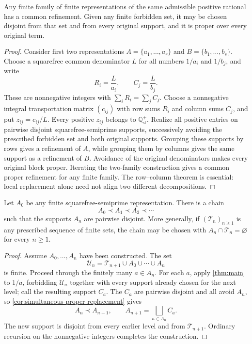 \begin{theorem}
\label{thm:common-refinement}
Any finite family of finite representations of the same admissible positive rational has a common refinement.  Given any finite forbidden set, it may be chosen disjoint from that set and from every original support, and it is proper over every original term.
\end{theorem}

\begin{proof}
Consider first two representations $A=\{a_1,\ldots,a_r\}$ and $B=\{b_1,\ldots,b_s\}$.  Choose a squarefree common denominator $L$ for all numbers $1/a_i$ and $1/b_j$, and write
\[
 R_i=\frac{L}{a_i},
 \qquad
 C_j=\frac{L}{b_j}.
\]
These are nonnegative integers with $\sum_iR_i=\sum_jC_j$.  Choose a nonnegative integral transportation matrix $(c_{ij})$ with row sums $R_i$ and column sums $C_j$, and put $z_{ij}=c_{ij}/L$.  Every positive $z_{ij}$ belongs to $\mathbb Q_{\mathrm{sf}}^+$.  Realize all positive entries on pairwise disjoint squarefree-semiprime supports, successively avoiding the prescribed forbidden set and both original supports.  Grouping these supports by rows gives a refinement of $A$, while grouping them by columns gives the same support as a refinement of $B$.  Avoidance of the original denominators makes every original block proper.  Iterating the two-family construction gives a common proper refinement for any finite family.  The row--column theorem is essential: local replacement alone need not align two different decompositions.
\end{proof}

\begin{theorem}
\label{thm:infinite-refinement-chain}
Let $A_0$ be any finite squarefree-semiprime representation.  There is a chain
\[
 A_0\prec A_1\prec A_2\prec\cdots
\]
such that the supports $A_n$ are pairwise disjoint.  More generally, if $(\mathcal T_n)_{n\geq1}$ is any prescribed sequence of finite sets, the chain may be chosen with $A_n\cap\mathcal T_n=\varnothing$ for every $n\geq1$.
\end{theorem}

\begin{proof}
Assume $A_0,\ldots,A_n$ have been constructed.  The set
\[
 \mathcal U_n=\mathcal T_{n+1}\cup A_0\cup\cdots\cup A_n
\]
is finite.  Proceed through the finitely many $a\in A_n$.  For each $a$, apply \cref{thm:main} to $1/a$, forbidding $\mathcal U_n$ together with every support already chosen for the next level; call the resulting support $C_a$.  The $C_a$ are pairwise disjoint and all avoid $A_n$, so \cref{cor:simultaneous-proper-replacement} gives
\[
 A_n\prec A_{n+1},
 \qquad
 A_{n+1}=\bigsqcup_{a\in A_n}C_a.
\]
The new support is disjoint from every earlier level and from $\mathcal T_{n+1}$.  Ordinary recursion on the nonnegative integers completes the construction.
\end{proof}